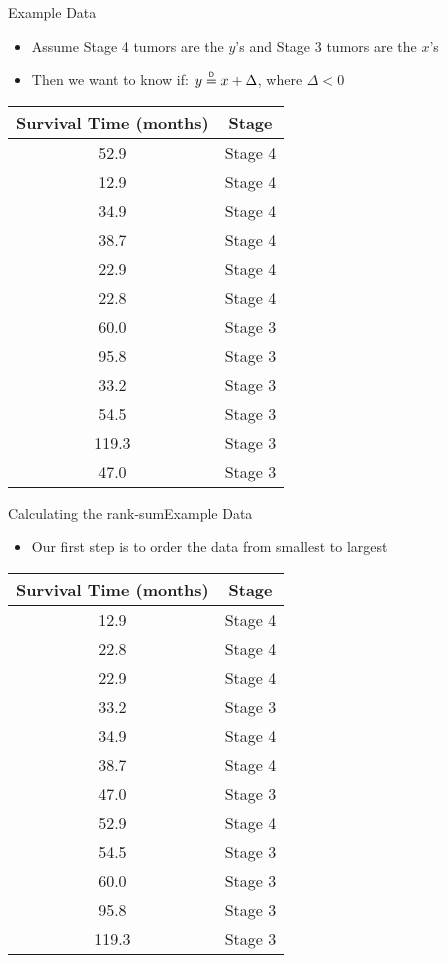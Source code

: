 \documentclass[xcolor=dvipsnames]{beamer}
\newcommand\myeq{\mathrel{\overset{\makebox[0pt]{\mbox{\normalfont\tiny\sffamily D}}}{=}}}
\begin{document}
\begin{frame}{Example Data}
\begin{itemize}
	\item Assume Stage 4 tumors are the $y$'s and Stage 3 tumors are the $x$'s \pause
	\item Then we want to know if: $y \myeq x + \Delta$, where $\Delta < 0$ \pause
\end{itemize}
\begin{center}
	\begin{tabular}{|c|c|}
		\hline
		\textbf{Survival Time (months)} &  \textbf{Stage} \\ \hline \hline
		52.9  &Stage 4 \\ \hline
		12.9 &Stage 4 \\ \hline
		34.9& Stage 4 \\ \hline
		38.7 &Stage 4 \\ \hline
		22.9& Stage 4 \\ \hline
		22.8 &Stage 4 \\ \hline
		60.0 &Stage 3 \\ \hline
		95.8& Stage 3 \\ \hline
		33.2 &Stage 3 \\ \hline
		54.5 &Stage 3 \\ \hline
		119.3 &Stage 3 \\ \hline
		47.0 &Stage 3 \\ \hline
	\end{tabular}
\end{center}
\end{frame}

\begin{frame}{Calculating the rank-sum}{Example Data}
\begin{itemize}
	\item Our first step is to order the data from smallest to largest
\end{itemize}
\begin{center}
	\begin{tabular}{|c|c|}
		\hline
		\textbf{Survival Time (months)} &  \textbf{Stage} \\ \hline \hline
		12.9 &Stage 4 \\ \hline
		22.8 &Stage 4 \\ \hline
		22.9& Stage 4 \\ \hline
		33.2 &Stage 3 \\ \hline
		34.9& Stage 4 \\ \hline
		38.7 &Stage 4 \\ \hline
		47.0 &Stage 3 \\ \hline		
		52.9  &Stage 4 \\ \hline
		54.5 &Stage 3 \\ \hline				
		60.0 &Stage 3 \\ \hline
		95.8& Stage 3 \\ \hline
		119.3 &Stage 3 \\ \hline
	\end{tabular}
\end{center}
\end{frame}
\end{document}
